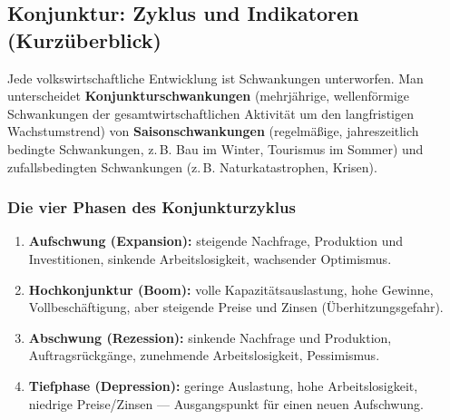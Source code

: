 \documentclass[11pt, a4paper]{article}
\begin{document}
\subsection{Konjunktur: Zyklus und Indikatoren (Kurzüberblick)}

Jede volkswirtschaftliche Entwicklung ist Schwankungen unterworfen. Man unterscheidet
\textbf{Konjunkturschwankungen} (mehrjährige, wellenförmige Schwankungen der
gesamtwirtschaftlichen Aktivität um den langfristigen Wachstumstrend) von
\textbf{Saisonschwankungen} (regelmäßige, jahreszeitlich bedingte Schwankungen, z.\,B.
Bau im Winter, Tourismus im Sommer) und zufallsbedingten Schwankungen (z.\,B.
Naturkatastrophen, Krisen).

\subsubsection{Die vier Phasen des Konjunkturzyklus}

\begin{enumerate}
  \item \textbf{Aufschwung (Expansion):} steigende Nachfrage, Produktion und
    Investitionen, sinkende Arbeitslosigkeit, wachsender Optimismus.
  \item \textbf{Hochkonjunktur (Boom):} volle Kapazitätsauslastung, hohe Gewinne,
    Vollbeschäftigung, aber steigende Preise und Zinsen (Überhitzungsgefahr).
  \item \textbf{Abschwung (Rezession):} sinkende Nachfrage und Produktion,
    Auftragsrückgänge, zunehmende Arbeitslosigkeit, Pessimismus.
  \item \textbf{Tiefphase (Depression):} geringe Auslastung, hohe Arbeitslosigkeit,
    niedrige Preise/Zinsen --- Ausgangspunkt für einen neuen Aufschwung.
\end{enumerate}
\end{document}
